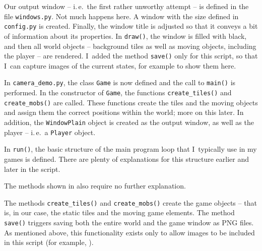Our output window -- i.\,e.\ the first rather unworthy attempt -- is defined in the file \texttt{windows.py}. Not much happens here. A window with the size defined in \texttt{config.py} is created. Finally, the window title is adjusted so that it conveys a bit of information about its properties. In \texttt{draw()}, the window is filled with black, and then all world objects -- background tiles as well as moving objects, including the player -- are rendered. I~added the method \texttt{save()} only for this script, so that I~can capture images of the current states, for example to show them here.



In \texttt{camera\_demo.py}, the class \texttt{Game} is now defined and the call to \texttt{main()} is performed. In the constructor of \texttt{Game}, the functions \texttt{create\_tiles()} and \texttt{create\_mobs()} are called. These functions create the tiles and the moving objects and assign them the correct positions within the world; more on this later. In addition, the \texttt{WindowPlain} object is created as the output window, as well as the player -- i.\,e.\ a \texttt{Player} object.

In \texttt{run()}, the basic structure of the main program loop that I~typically use in my games is defined. There are plenty of explanations for this structure earlier and later in the script.

\newpage
{}

The methods shown in  also require no further explanation.


The methods \texttt{create\_tiles()} and \texttt{create\_mobs()} create the game objects -- that is, in our case, the static tiles and the moving game elements. The method \texttt{save()} triggers saving both the entire world and the game window as PNG files. As mentioned above, this functionality exists only to allow images to be included in this script (for example, ).

